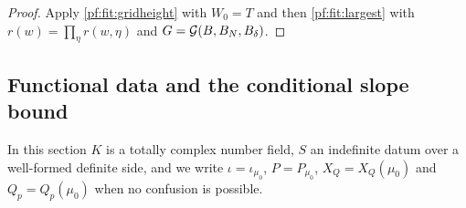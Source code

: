 \begin{proof}
Apply \cref{pf:fit:gridheight} with $W_0=T$ and then \cref{pf:fit:largest} with $r(w)=\prod_\eta r(w,\eta)$ and
$G=\mathcal{G}(B,B_N,B_\delta)$.
\end{proof}

\subsection{Functional data and the conditional slope bound}\label{sec:pf:fit:cond}

In this section $K$ is a totally complex number field, $S$ an indefinite datum over a well-formed definite side, and we
write $\iota=\iota_{\mu_0}$, $P=P_{\mu_0}$, $X_Q=X_Q(\mu_0)$ and $Q_p=Q_p(\mu_0)$ when no confusion is possible.

